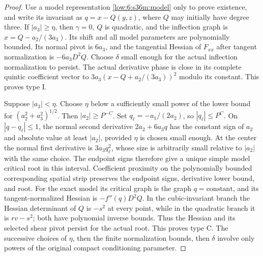 \documentclass[11pt]{amsart}
\theoremstyle{definition}
\theoremstyle{remark}
\numberwithin{equation}{section}
\begin{document}
\begin{proof}
Use a model representation \eqref{low:6:s36m:model} only to prove existence, and write its invariant as $q=x-Q(y,z)$, where $Q$ may initially have degree three. If $|a_3|\ge\eta$, then $\gamma=0$, $Q$ is quadratic, and the inflection graph is $x=Q-a_2/(3a_3)$. Its shift and all model parameters are polynomially bounded. Its normal pivot is $6a_3$, and the tangential Hessian of $F_{xx}$ after tangent normalization is $-6a_3D^2Q$. Choose $\delta$ small enough for the actual inflection normalization to persist. The actual derivative phase is close in its complete quintic coefficient vector to $3a_3(x-Q+a_2/(3a_3))^2$ modulo its constant. This proves type I.

Suppose $|a_3|<\eta$. Choose $\eta$ below a sufficiently small power of the lower bound for $(a_2^2+a_3^2)^{1/2}$. Then $|a_2|\ge P^{-C}$. Set $q_\ell=-a_1/(2a_2)$, so $|q_\ell|\le P^C$. On $|q-q_\ell|\le1$, the normal second derivative $2a_2+6a_3q$ has the constant sign of $a_2$ and absolute value at least $|a_2|$, provided $\eta$ is chosen small enough. At the center the normal first derivative is $3a_3q_\ell^2$, whose size is arbitrarily small relative to $|a_2|$ with the same choice. The endpoint signs therefore give a unique simple model critical root in this interval. Coefficient proximity on the polynomially bounded corresponding spatial strip preserves the endpoint signs, derivative lower bound, and root. For the exact model its critical graph is the graph $q=\text{constant}$, and its tangent-normalized Hessian is $-f''(q)D^2Q$. In the cubic-invariant branch the Hessian determinant of $Q$ is $-s^2$ at every point, while in the quadratic branch it is $rv-s^2$; both have polynomial inverse bounds. Thus the Hessian and its selected shear pivot persist for the actual root. This proves type C. The successive choices of $\eta$, then the finite normalization bounds, then $\delta$ involve only powers of the original compact conditioning parameter.
\end{proof}
\end{document}

